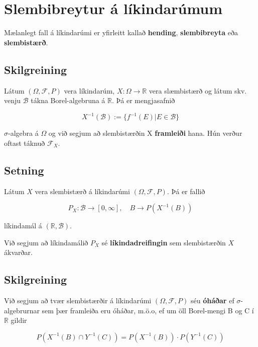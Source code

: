 \documentclass[]{book}
\begin{document}
\hypertarget{slembibreytur-a-likindarumum}{%
\chapter{Slembibreytur á líkindarúmum}\label{slembibreytur-a-likindarumum}}

Mælanlegt fall á líkindarúmi er yfirleitt kallað \textbf{hending}, \textbf{slembibreyta} eða \textbf{slembistærð}.

\hypertarget{skilgreining-17}{%
\section{Skilgreining}\label{skilgreining-17}}

Látum \((\Omega, \mathcal F, P)\) vera líkindarúm, \(X: \Omega \rightarrow \mathbb R\) vera slæmbistærð og látum skv. venju \(\mathcal B\) tákna Borel-algebruna á \(\mathbb R\). Þá er mengjasafnið

\[
X^{-1}(\mathcal B) := \{f^{-1}(E) | E \in \mathcal B\}
\]

\(\sigma\)-algebra á \(\Omega\) og við segjum að slembistærðin X \textbf{framleiði} hana. Hún verður oftast táknuð \(\mathcal F_X\).

\hypertarget{setning-42}{%
\section{Setning}\label{setning-42}}

Látum \(X\) vera slembistærð á líkindarúmi \((\Omega, \mathcal F, P)\). Þá er fallið

\[
P_X: \mathcal B \rightarrow [0, \infty], \quad B\rightarrow P(X^{-1}(B))
\]

líkindamál á \((\mathbb R, \mathcal B)\).

Við segjum að líkindamálið \(P_X\) sé \textbf{líkindadreifingin} sem slembistærðin \(X\) ákvarðar.

\hypertarget{skilgreining-18}{%
\section{Skilgreining}\label{skilgreining-18}}

Við segjum að tvær slembistærðir á líkindarúmi \((\Omega, \mathcal F, P)\) séu \textbf{óháðar} ef \(\sigma\)-algebrurnar sem þær framleiða eru óháðar, m.ö.o, ef um öll Borel-mengi B og C í \(\mathbb R\) gildir

\[
P(X^{-1}(B)\cap Y^{-1}(C)) = P(X^{-1}(B))\cdot P(Y^{-1}(C))
\]
\end{document}
